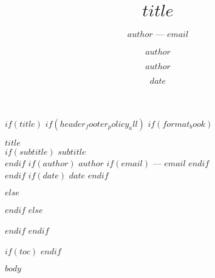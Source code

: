 \documentclass[12pt, openany]{book}
\title{$title$}
\author{$author$ --- $email$}
\author{$author$}
\author{$author$}
\date{$date$}
\date{}
\begin{document}
$if(title)$
$if(header_footer_policy_all)$
$if(format_book)$
\thispagestyle{titlepage}
\begin{center}
\vspace*{\fill}
{\Huge \textbf{$title$}}\\[0.5cm]
$if(subtitle)$
{\LARGE \textit{$subtitle$}}\\[1.5cm]
$endif$
$if(author)$
{\large $author$ $if(email)$ --- $email$ $endif$}\\[1cm]
$endif$
$if(date)$
{\large $date$}
$endif$
\vspace*{\fill}
\end{center}
\newpage
$else$
\maketitle
$endif$
$else$
\maketitle
$endif$
$endif$

\setcounter{tocdepth}{2}
$if(toc)$
\tableofcontents
\newpage
$endif$

$body$
\end{document}
